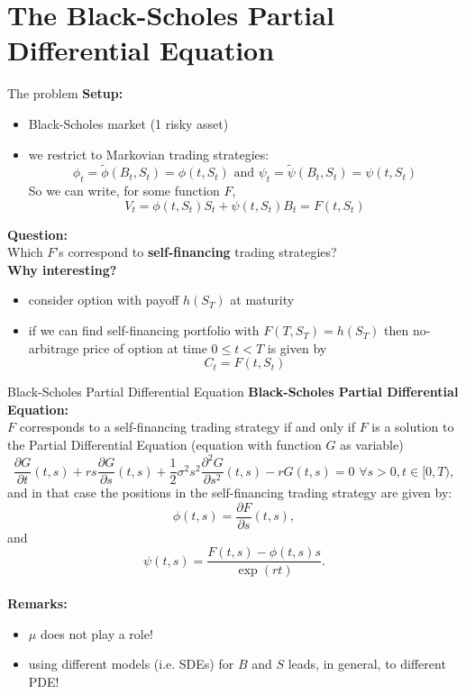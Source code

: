 \documentclass[pdf, handout]{beamer}
\begin{document}
\section[toc=Black-Scholes PDE]{The Black-Scholes Partial Differential Equation}

\begin{frame}{The problem}
\textbf{Setup:}
\begin{itemize}
\item Black-Scholes market (1 risky asset)
\item we restrict to
Markovian trading strategies:
\[
\phi_t=\tilde\phi(B_t, S_t)= \phi(t,S_t) \text{ and } \psi_t=\tilde\psi(B_t, S_t)
=\psi (t, S_t)
\]
So we can write, for some function $F$,
\[
 V_t=\phi(t, S_t) S_t + \psi(t, S_t) B_t=F(t, S_t)
\]
\end{itemize}
\textbf{Question:} \\
Which $F$'s correspond to \textbf{self-financing} trading strategies?
\\ \vspace{.25cm}
\textbf{Why interesting?}
\begin{itemize}
\item consider option with payoff $h(S_T)$ at maturity
\item if we can find self-financing portfolio with $F(T, S_T)= h(S_T)$ then
no-arbitrage price of option at time $0\leq t <T$ is given by
\[
C_t=F(t, S_t)
\]
\end{itemize}
\end{frame}

\begin{frame}{Black-Scholes Partial Differential Equation}
\textbf{Black-Scholes Partial Differential Equation:} \\
$F$ corresponds to a self-financing trading strategy if and only if $F$ is a solution to the Partial Differential Equation (equation with function $G$ as variable)
\[
\frac{\partial G}{\partial t}(t, s) + r s \frac{\partial G}{\partial
s}(t, s) + \frac{1}{2}\sigma^2 s^2 \frac{\partial^2 G}{\partial
s^2}(t,s) -r G(t,s )=0\,\, \forall s>0, t\in[0, T),
\]
and in that case the positions in the self-financing trading strategy are given by:
\[
\phi(t,s)=\frac{\partial F}{\partial s}(t, s),
\]
and
\[
\psi(t,s)=\frac{F(t,s)-\phi(t,s) s}{\exp(rt)}.
\]
\\ \vspace{.3cm}
\textbf{Remarks:}
\begin{itemize}
\item  $\mu$ does not play a role!
\item using different models (i.e. SDEs)
for $B$ and $S$ leads, in general, to
different PDE!
\end{itemize}
\end{frame}
\end{document}
